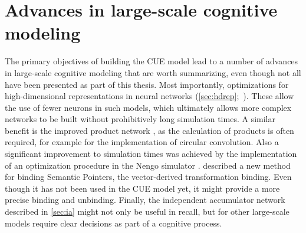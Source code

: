 \section{Advances in large-scale cognitive modeling}
The primary objectives of building the CUE model lead to a number of advances in large-scale cognitive modeling that are worth summarizing, even though not all have been presented as part of this thesis.
Most importantly, optimizations for high-dimensional representations in neural networks (\cref{sec:hdrep};\ \cite{gosmann216}).
These allow the use of fewer neurons in such models, which ultimately allows more complex networks to be built without prohibitively long simulation times.
A similar benefit is the improved product network \parencite{gosmann2015-1}, as the calculation of products is often required, for example for the implementation of circular convolution.
Also a significant improvement to simulation times was achieved by the implementation of an optimization procedure in the Nengo simulator \parencite{gosmann2017}.
 described a new method for binding Semantic Pointers, the vector-derived transformation binding.
Even though it has not been used in the CUE model yet, it might provide a more precise binding and unbinding.
Finally, the independent accumulator network described in \cref{sec:ia} might not only be useful in recall, but for other large-scale models require clear decisions as part of a cognitive process.
